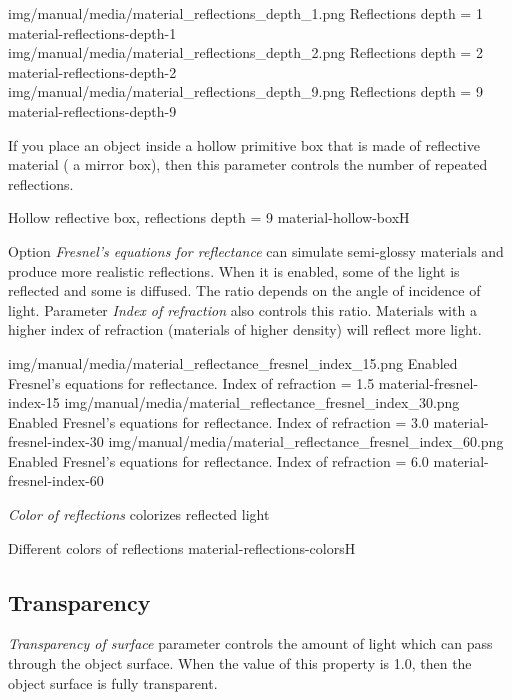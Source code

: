 \threeImagesWithTwoCaptionsFullWidth
{img/manual/media/material_reflections_depth_1.png}
{Reflections depth = 1}
{material-reflections-depth-1}
{img/manual/media/material_reflections_depth_2.png}
{Reflections depth = 2}
{material-reflections-depth-2}
{img/manual/media/material_reflections_depth_9.png}
{Reflections depth = 9}
{material-reflections-depth-9}

If you place an object inside a hollow primitive box that is made of reflective material ( a mirror box), then this parameter controls the number of repeated reflections.

{Hollow reflective box, reflections depth = 9}
{material-hollow-box}{H}

Option \emph{Fresnel's equations for reflectance} can simulate semi-glossy materials and produce more realistic reflections. When it is enabled, some of the light is reflected and some is diffused. The ratio depends on the angle of incidence of light. Parameter \emph{Index of refraction} also controls this ratio. Materials with a higher index of refraction (materials of higher density) will reflect more light. 

\threeImagesWithTwoCaptionsFullWidth
{img/manual/media/material_reflectance_fresnel_index_15.png}
{Enabled Fresnel's equations for reflectance. Index of refraction = 1.5}
{material-fresnel-index-15}
{img/manual/media/material_reflectance_fresnel_index_30.png}
{Enabled Fresnel's equations for reflectance. Index of refraction = 3.0}
{material-fresnel-index-30}
{img/manual/media/material_reflectance_fresnel_index_60.png}
{Enabled Fresnel's equations for reflectance. Index of refraction = 6.0}
{material-fresnel-index-60}

\emph{Color of reflections} colorizes reflected light

{Different colors of reflections}
{material-reflections-colors}{H}

\subsection{Transparency}\label{materials-transparency}

\emph{Transparency of surface} parameter controls the amount of light which can pass through the object surface. 
When the value of this property is 1.0, then the object surface is fully transparent. 

